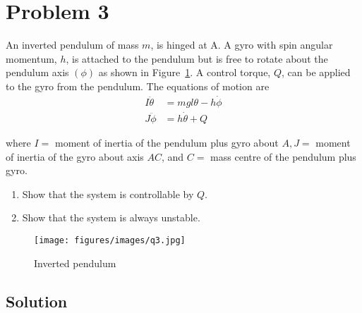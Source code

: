 \section*{Problem 3}

An inverted pendulum of mass \( m \), is hinged at A.
A gyro with spin angular momentum, \( h \), is attached to the pendulum but is free to rotate about the pendulum axis \( (\phi) \) as shown in Figure~\ref{fig:q3}.
A control torque, \( Q \), can be applied to the gyro from the pendulum.
The equations of motion are
\vspace*{-1em}
\begin{align*}
    I \ddot{\theta} & =m g l \theta-h \dot{\phi} \\
    J \ddot{\phi}   & =h \dot{\theta}+Q
\end{align*}

\vspace*{-0.5em}
where \( I= \) moment of inertia of the pendulum plus gyro about \( A, J= \) moment of inertia of the gyro about axis \( A C \), and \( C= \) mass centre of the pendulum plus gyro.
\begin{enumerate}[label= (\alph*), topsep=3pt, itemsep=-0.25em]
    \item Show that the system is controllable by \( Q \).
    \item Show that the system is always unstable.
\end{enumerate}
\vspace*{-1.5em}
\begin{figure}[h]
    \centering
    \texttt{[image: figures/images/q3.jpg]}
    \caption{
        Inverted pendulum
    }\label{fig:q3}
\end{figure}
\vspace*{-3em}

\subsection*{Solution}
